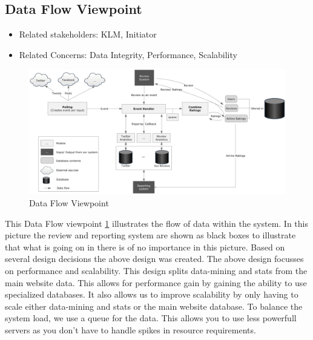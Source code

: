 % 

\subsection{Data Flow Viewpoint}

\begin{itemize}
\item Related stakeholders: KLM, Initiator
\item Related Concerns: Data Integrity, Performance, Scalability
\end{itemize}

\newpage
\begin{landscape}
\begin{figure}
\includegraphics[width=600px]{DataFlowGraph}
\caption{Data Flow Viewpoint}
\label{fig:Data Flow}
\end{figure}
\end{landscape}

This Data Flow viewpoint \ref{fig:Data Flow} illustrates the flow of data within the system. In this picture the review and reporting system are shown as black boxes to illustrate that what is going on in there is of no importance in this picture.
Based on several design decisions the above design was created. The above design focusses on performance and scalability.
This design splits data-mining and stats from the main website data. This allows for performance gain by gaining the ability to use specialized databases. It also allows us to improve scalability by only having to scale either data-mining and stats or the main website database.
To balance the system load, we use a queue for the data. This allows you to use less powerfull servers as you don't have to handle spikes in resource requirements.

